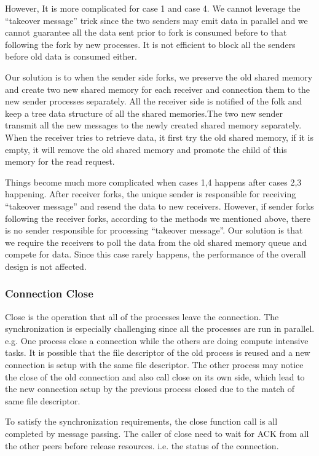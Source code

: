 However, It is more complicated for case 1 and case 4. We cannot leverage the ``takeover message'' trick since the two senders may emit data in parallel and we cannot guarantee all the data sent prior to fork is consumed before to that following the fork by new processes. It is not efficient to block all the senders before old data is consumed either.

Our solution is to when the sender side forks, we preserve the old shared memory and create two new shared memory for each receiver and connection them to the new sender processes separately. All the receiver side is notified of the folk and keep a tree data structure of all the shared memories.The two new sender transmit all the new messages to the newly created shared memory separately. When the receiver tries to retrieve data, it first try the old shared memory, if it is empty, it will remove the old shared memory and promote the child of this memory for the read request. 

Things become much more complicated when cases 1,4 happens after cases 2,3 happening. After receiver forks, the unique sender is responsible for receiving ``takeover message'' and resend the data to new receivers. However, if sender forks following the receiver forks, according to the methods we mentioned above, there is no sender responsible for processing ``takeover message''. Our solution is that we require the receivers to poll the data from the old shared memory queue and compete for data. Since this case rarely happens, the performance of the overall design is not affected.

\subsubsection{Connection Close}

Close is the operation that all of the processes leave the connection. The synchronization is  especially challenging since all the processes are run in parallel. e.g. One process close a connection while the others are doing compute intensive tasks. It is possible that the file descriptor of the old process is reused and a new connection is setup with the same file descriptor. The other process may notice the close of the old connection and also call close on its own side, which lead to the new connection setup by the previous process closed due to the match of same file descriptor. 

To satisfy the synchronization requirements, the close function call is all completed by message passing. The caller of close need to wait for ACK from all the other peers before release resources. i.e. the status of the connection.

